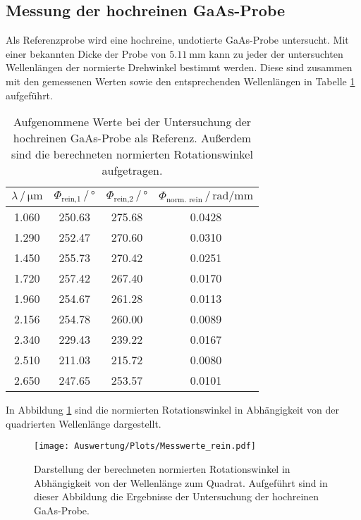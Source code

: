  \subsection{Messung der hochreinen GaAs-Probe}
 Als Referenzprobe wird eine hochreine, undotierte GaAs-Probe untersucht.
 Mit einer bekannten Dicke der Probe von $\SI{5.11}{\milli\meter}$ kann zu jeder der untersuchten
 Wellenlängen der normierte Drehwinkel bestimmt werden. Diese sind zusammen mit den gemessenen Werten sowie den
 entsprechenden Wellenlängen in Tabelle \ref{tab:hr_Messung} aufgeführt.
 \begin{table}[H]
    \centering
    \caption{Aufgenommene Werte bei der Untersuchung der hochreinen GaAs-Probe als Referenz. Außerdem sind die
    berechneten normierten Rotationswinkel aufgetragen.}
    \label{tab:hr_Messung}
    \begin{tabular}{cccc}
      \toprule
      $\lambda\, / \, \si{\micro\meter}$ & $\Phi_\text{rein,1} \, / \, \si{\degree}$ & $\Phi_\text{rein,2} \, / \, \si{\degree}$ & $\Phi_\text{norm. rein} \, / \, \si{\radian\per\milli\meter}$  \\
      \midrule
      \num{1.060} & \num{250.63} & \num{275.68} & \num{0.0428}  \\
      \num{1.290} & \num{252.47} & \num{270.60} & \num{0.0310}  \\
      \num{1.450} & \num{255.73} & \num{270.42} & \num{0.0251}  \\
      \num{1.720} & \num{257.42} & \num{267.40} & \num{0.0170}  \\
      \num{1.960} & \num{254.67} & \num{261.28} & \num{0.0113}  \\
      \num{2.156} & \num{254.78} & \num{260.00} & \num{0.0089}  \\
      \num{2.340} & \num{229.43} & \num{239.22} & \num{0.0167}  \\
      \num{2.510} & \num{211.03} & \num{215.72} & \num{0.0080}  \\
      \num{2.650} & \num{247.65} & \num{253.57} & \num{0.0101}  \\
      \bottomrule
    \end{tabular}
   \end{table} \noindent
   In Abbildung \ref{fig:hr_Messung} sind die normierten Rotationswinkel in Abhängigkeit von der quadrierten
   Wellenlänge dargestellt.
   \begin{figure}[H]
       \centering
       \texttt{[image: Auswertung/Plots/Messwerte\_rein.pdf]}
       \caption{Darstellung der berechneten normierten Rotationswinkel in Abhängigkeit von der Wellenlänge
       zum Quadrat. Aufgeführt sind in dieser Abbildung die Ergebnisse der Untersuchung der hochreinen GaAs-Probe. }
       \label{fig:hr_Messung}
   \end{figure}

